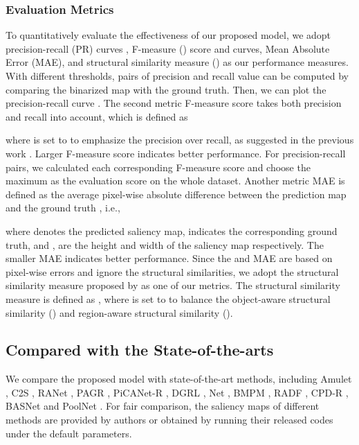 \documentclass[letterpaper]{article} \usepackage{aaai20}  \usepackage{times}  \usepackage{helvet} \usepackage{courier}  \usepackage[hyphens]{url}  \usepackage{graphicx} \urlstyle{rm} \def\UrlFont{\rm}  \usepackage{graphicx}  \frenchspacing  \setlength{\pdfpagewidth}{8.5in}  \setlength{\pdfpageheight}{11in}
\begin{document}
\subsubsection{Evaluation Metrics} 
To quantitatively evaluate the effectiveness of our proposed model, we adopt precision-recall (PR) curves , F-measure () score and curves, Mean Absolute Error (MAE), and
structural similarity measure () as our performance measures. 
With different thresholds, pairs of precision and recall value can be computed by comparing the binarized map with the ground truth. 
Then, we can plot the precision-recall curve \cite{cong2019video}. 
The second metric F-measure score takes both precision and recall into account,
which is defined as 

where  is set to  to emphasize the precision over recall,
as suggested in the previous work \cite{cong2018hscs}.
Larger F-measure score indicates better performance.
For precision-recall pairs, we calculated each corresponding F-measure score and choose the maximum as the evaluation score on the whole dataset.
Another metric MAE is defined as the average pixel-wise absolute difference
between the prediction map and the ground truth \cite{cong2017iterative}, i.e., 

where  denotes the predicted saliency map,  indicates the corresponding 
ground truth, and ,  are the height and width of the saliency map respectively.
The smaller MAE indicates better performance.
Since the  and MAE are based on pixel-wise errors and ignore the structural similarities, 
we adopt the structural similarity measure proposed by \cite{fan2017structure} as one of our metrics.
The structural similarity measure is defined as 
, where  is set to  to balance the object-aware structural similarity () and region-aware structural similarity (). 
\subsection{Compared with the State-of-the-arts}
We compare the proposed model with  state-of-the-art methods, including Amulet \cite{zhang2017amulet}, 
C2S \cite{li2018contour}, 
RANet \cite{chen2018reverse}, PAGR \cite{zhang2018progressive},
PiCANet-R \cite{liu2018picanet}, DGRL \cite{wang2018detect}, Net \cite{deng2018r3net}, 
BMPM \cite{zhang2018bi}, RADF \cite{hu2018recurrently}, CPD-R \cite{wu2019cascaded}, 
BASNet \cite{qin2019basnet} and PoolNet \cite{liu2019simple}.
For fair comparison, the saliency maps of different methods are provided by authors 
or obtained by running their released codes under the default parameters.
\end{document}
